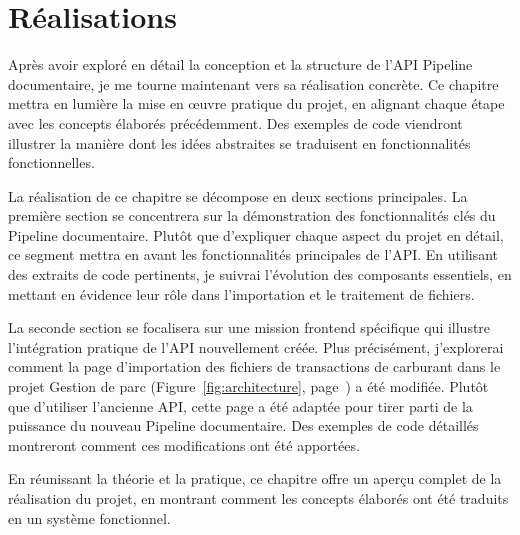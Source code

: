 \chapter{Réalisations}\label{ch:realisations}

Après avoir exploré en détail la conception et la structure de l'API Pipeline documentaire, je me tourne maintenant vers sa réalisation concrète. Ce chapitre mettra en lumière la mise en œuvre pratique du projet, en alignant chaque étape avec les concepts élaborés précédemment. Des exemples de code viendront illustrer la manière dont les idées abstraites se traduisent en fonctionnalités fonctionnelles.

La réalisation de ce chapitre se décompose en deux sections principales. La première section se concentrera sur la démonstration des fonctionnalités clés du Pipeline documentaire. Plutôt que d'expliquer chaque aspect du projet en détail, ce segment mettra en avant les fonctionnalités principales de l'API. En utilisant des extraits de code pertinents, je suivrai l'évolution des composants essentiels, en mettant en évidence leur rôle dans l'importation et le traitement de fichiers.

La seconde section se focalisera sur une mission frontend spécifique qui illustre l'intégration pratique de l'API nouvellement créée. Plus précisément, j'explorerai comment la page d'importation des fichiers de transactions de carburant dans le projet Gestion de parc (Figure~\ref{fig:architecture}, page~\pageref{fig:architecture}) a été modifiée. Plutôt que d'utiliser l'ancienne API, cette page a été adaptée pour tirer parti de la puissance du nouveau Pipeline documentaire. Des exemples de code détaillés montreront comment ces modifications ont été apportées.

En réunissant la théorie et la pratique, ce chapitre offre un aperçu complet de la réalisation du projet, en montrant comment les concepts élaborés ont été traduits en un système fonctionnel.



